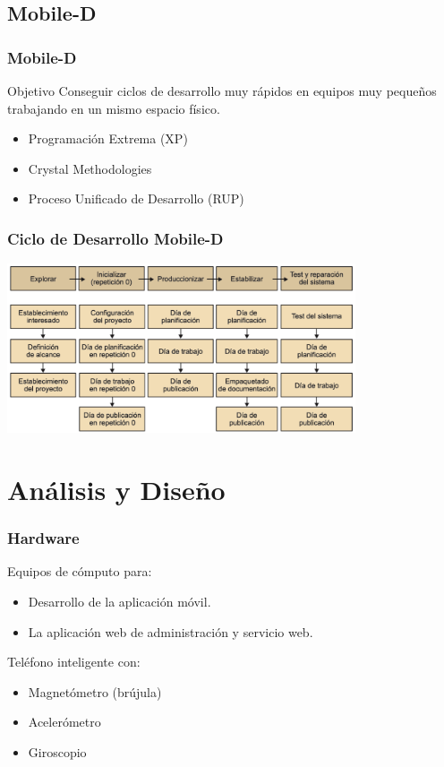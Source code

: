 \documentclass[12pt]{beamer}
\begin{document}
\subsection{Mobile-D}

\begin{frame}
	\frametitle{Mobile-D}
	\begin{block}{Objetivo}
		Conseguir ciclos de desarrollo muy rápidos en equipos muy pequeños trabajando en un mismo espacio físico.
	\end{block}
	\begin{block} \small 
		\begin{itemize}
			\item 	Programación Extrema (XP)
			\item Crystal Methodologies
			\item Proceso Unificado de Desarrollo (RUP)
		\end{itemize} 
	\end{block}
\end{frame}

\begin{frame}
	\frametitle{Ciclo de Desarrollo Mobile-D}
	\includegraphics[height=5cm]{imagenes/mobiled.png}
\end{frame}

\section{Análisis y Diseño}

\begin{frame}
	\frametitle{Hardware}
	\begin{block}{	Equipos de cómputo para:}
	\begin{itemize}
		\item Desarrollo de la aplicación móvil.
		\item La aplicación web de administración y servicio web.
	\end{itemize}
	\end{block}
	
	\begin{block}{	Teléfono inteligente con:}
	\begin{itemize}
		\item Magnetómetro (brújula)
		\item Acelerómetro
		\item Giroscopio
	\end{itemize}
	\end{block}
\end{frame}
\end{document}
